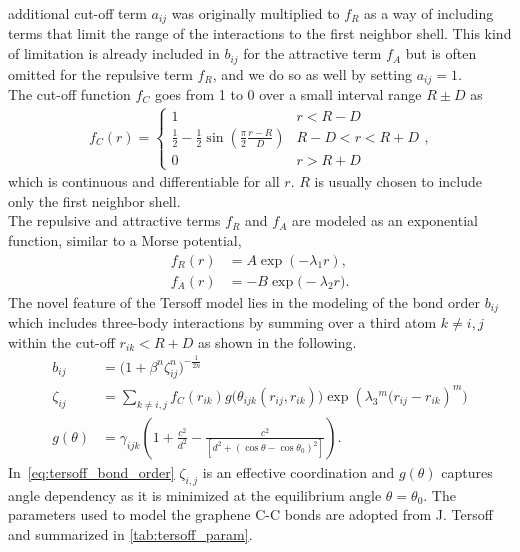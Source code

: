 additional cut-off term $a_{ij}$ was originally multiplied to $f_R$ as a way of
including terms that limit the range of the interactions to the first neighbor
shell. This kind of limitation is already included in $b_{ij}$ for the
attractive term $f_A$ but is often omitted for the repulsive term $f_R$, and we
do so as well by setting $a_{ij} = 1$. \\
The cut-off function $f_C$ goes from 1 to 0 over a small interval range $R \pm
D$ as
\begin{align*}
  f_C(r) =
  \begin{cases}
    1 & r < R - D \\
    \frac{1}{2} - \frac{1}{2} \sin{(\frac{\pi}{2} \frac{r - R}{D})} & R - D < r < R + D\\
    0 & r > R + D
  \end{cases},
\end{align*}
which is continuous and differentiable for all $r$. $R$ is usually chosen to
include only the first neighbor shell. \\
The repulsive and attractive terms $f_R$ and $f_A$ are modeled as an exponential function, similar to a Morse potential, 
\begin{align*}
 f_R(r) &= A \exp(-\lambda_1 r), \\
 f_A(r) &= -B \exp \big(-\lambda_2 r\big).
\end{align*}
The novel feature of the Tersoff model lies in the modeling of the bond order
$b_{ij}$ which includes three-body interactions by summing over a third atom $k
\ne i,j$ within the cut-off $r_{ik} < R + D$ as shown in the following.
\begin{align}
  b_{i j} & =\big(1+\beta^n \zeta_{i j}^n\big)^{-\frac{1}{2 n}} \\
  \zeta_{i j} & =\sum_{k \ne i,j} f_C(r_{i k}) g\Big(\theta_{i j k}\left(r_{i j}, r_{i k}\right)\Big) \exp \left(\lambda_3{ }^m\big(r_{i j}-r_{i k}\right)^m\big) \\
  g(\theta) & =\gamma_{i j k}\left(1+\frac{c^2}{d^2}-\frac{c^2}{\left[d^2+\left(\cos \theta-\cos \theta_0\right)^2\right]}\right).
  \label{eq:tersoff_bond_order}
\end{align}
In~\cref{eq:tersoff_bond_order} $\zeta_{i,j}$ is an effective coordination and
$g(\theta)$ captures angle dependency as it is minimized at the equilibrium
angle $\theta = \theta_0$. The parameters used to model the graphene C-C bonds
are adopted from J. Tersoff \cite{PhysRevB.39.5566} and summarized in
\cref{tab:tersoff_param}.


